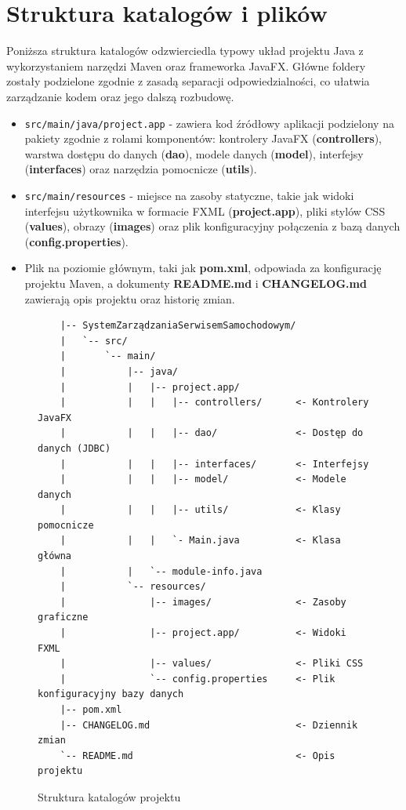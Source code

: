 \newpage
\section{Struktura katalogów i plików}
\label{sec:strukturaKatalogow}
Poniższa struktura katalogów odzwierciedla typowy układ projektu Java z wykorzystaniem narzędzi Maven oraz frameworka JavaFX. Główne foldery zostały podzielone zgodnie z zasadą separacji odpowiedzialności, co ułatwia zarządzanie kodem oraz jego dalszą rozbudowę.
\begin{itemize}
    \item \texttt{src/main/java/project.app} - zawiera kod źródłowy aplikacji podzielony na pakiety zgodnie z rolami komponentów: kontrolery JavaFX (\textbf{controllers}), warstwa dostępu do danych (\textbf{dao}), modele danych (\textbf{model}), interfejsy (\textbf{interfaces}) oraz narzędzia pomocnicze (\textbf{utils}).
    \item \texttt{src/main/resources} - miejsce na zasoby statyczne, takie jak widoki interfejsu użytkownika w formacie FXML (\textbf{project.app}), pliki stylów CSS (\textbf{values}), obrazy (\textbf{images}) oraz plik konfiguracyjny połączenia z bazą danych (\textbf{config.properties}).
    \item Plik na poziomie głównym, taki jak \textbf{pom.xml}, odpowiada za konfigurację projektu Maven, a dokumenty \textbf{README.md} i \textbf{CHANGELOG.md} zawierają opis projektu oraz historię zmian.
\end{itemize}


\begin{figure}[H]
    \label{strukturaKatalogow}
    \centering
    \begin{verbatim}
    |-- SystemZarządzaniaSerwisemSamochodowym/
    |   `-- src/
    |       `-- main/
    |           |-- java/
    |           |   |-- project.app/
    |           |   |   |-- controllers/      <- Kontrolery JavaFX
    |           |   |   |-- dao/              <- Dostęp do danych (JDBC)
    |           |   |   |-- interfaces/       <- Interfejsy
    |           |   |   |-- model/            <- Modele danych
    |           |   |   |-- utils/            <- Klasy pomocnicze
    |           |   |   `- Main.java          <- Klasa główna
    |           |   `-- module-info.java
    |           `-- resources/
    |               |-- images/               <- Zasoby graficzne
    |               |-- project.app/          <- Widoki FXML
    |               |-- values/               <- Pliki CSS
    |               `-- config.properties     <- Plik konfiguracyjny bazy danych
    |-- pom.xml
    |-- CHANGELOG.md                          <- Dziennik zmian
    `-- README.md                             <- Opis projektu
    \end{verbatim}
    \caption{Struktura katalogów projektu}
\end{figure}

